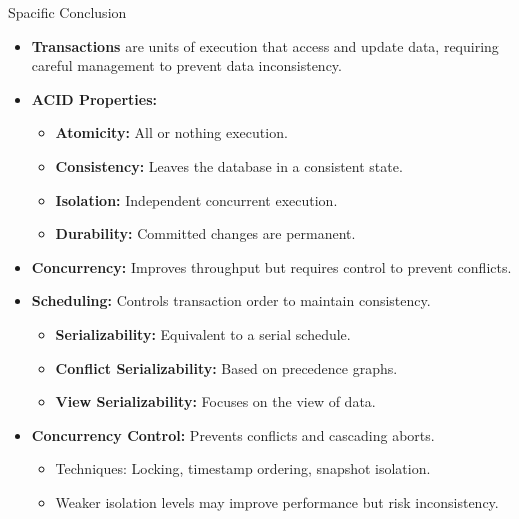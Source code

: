 \documentclass[aspectratio=169]{beamer}
\begin{document}
\begin{frame}{Spacific Conclusion}
    \scriptsize
    \begin{itemize}
        \item \textbf{Transactions} are units of execution that access and update data, requiring careful management to prevent data inconsistency.
        \item \textbf{ACID Properties:}
        \begin{itemize}
            \scriptsize
            \item \textbf{Atomicity:} All or nothing execution.
            \item \textbf{Consistency:} Leaves the database in a consistent state.
            \item \textbf{Isolation:} Independent concurrent execution.
            \item \textbf{Durability:} Committed changes are permanent.
        \end{itemize}
        \item \textbf{Concurrency:} Improves throughput but requires control to prevent conflicts.
        \item \textbf{Scheduling:} Controls transaction order to maintain consistency.
        \begin{itemize}
            \scriptsize
            \item \textbf{Serializability:} Equivalent to a serial schedule.
            \item \textbf{Conflict Serializability:} Based on precedence graphs.
            \item \textbf{View Serializability:} Focuses on the view of data.
        \end{itemize}
        \item \textbf{Concurrency Control:} Prevents conflicts and cascading aborts.
        \begin{itemize}
            \item Techniques: Locking, timestamp ordering, snapshot isolation.
            \item Weaker isolation levels may improve performance but risk inconsistency.
        \end{itemize}
    \end{itemize}
\end{frame}

\end{document}
